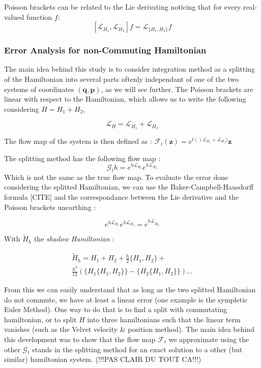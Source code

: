 \documentclass[ansiapaper]{report}
\begin{document}
\begin{multicols}{3}
  Poisson brackets can be related to the Lie derivating noticing that for every real-valued function $f$: $$[\mathcal{L}_{H_1}, \mathcal{L}_{H_2}]f = \mathcal{L}_{\{H_1, H_2\}}f$$

  \subsubsection{Error Analysis for non-Commuting Hamiltonian}
  The main idea behind this study is to consider integration method as a splitting of the Hamiltonian into several parts oftenly independant of one of the two systems of coordinates $(\textbf{q}, \textbf{p})$, as we will see further. The Poisson brackets are linear with respect to the Hamiltonian, which allows us to write the following considering $H = H_1 + H_2$,

  $$\mathcal{L}_H = \mathcal{L}_{H_1} + \mathcal{L}_{H_2}$$

  The flow map of the system is then defined as : $\mathcal{F}_t(\textbf{z}) = e^{t()\mathcal{L}_{H_1} + \mathcal{L}_{H_2})}\textbf{z}  $

  The splitting method has the following flow map : $$\mathcal{G}_th= e^{h\mathcal{L}_{H_1}}e^{h\mathcal{L}_{H_2}}$$ Which is not the same as the true flow map. To evaluate the error done considering the splitted Hamiltonian, we can use the Baker-Campbell-Hausdorff formula [CITE] and the correspondance between the Lie derivative and the Poisson brackets unearthing :

  $$ e^{h\mathcal{L}_{H_1}}e^{h\mathcal{L}_{H_2}} = e^{ h \mathcal{L}_{\tilde{H}_h}}$$

  With $\tilde{H}_h$ the \textit{shadow Hamiltonian} :

  \begin{multline*}
    \tilde{H}_h = H_1 + H_2 + \frac{h}{2}\{H_1 , H_2 \} + \\
    \frac{h^2}{12}(\{H_1 \{H_1 , H_2\} \} - \{H_2 \{H_1 , H_2 \} \}) \dots
  \end{multline*}


  From this we can easily understand that as long as the two splitted Hamiltonian do not commute, we have at least a linear error (one example is the sympletic Euler Method). One way to do that is to find a split with commutating hamiltonian, or to split $H$ into three hamiltonians such that the linear term vanishes (such as the Velvet velocity \& position method). The main idea behind this  development was to show that the flow map $\mathcal{F}_t$ we approximate using the other $\mathcal{G}_t$ stands in the splitting method for an exact solution to a other (but similar) hamiltonian system. (!!!PAS CLAIR DU TOUT CA!!!)


\end{multicols}
\end{document}
